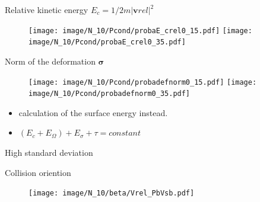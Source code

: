\documentclass[aspectratio=169]{beamer}
\begin{document}
\begin{frame}
  {Relative kinetic energy  $E_c = 1/2 m |\bm{v}{rel}|^2$}
  \begin{figure}
    \centering
    \texttt{[image: image/N\_10/Pcond/probaE\_crel0\_15.pdf]}
    \texttt{[image: image/N\_10/Pcond/probaE\_crel0\_35.pdf]}
  \end{figure}
\end{frame}

\begin{frame}
  {Norm of the deformation  $\bm{\sigma}$}
  \begin{figure}
    \centering
    \texttt{[image: image/N\_10/Pcond/probadefnorm0\_15.pdf]}
    \texttt{[image: image/N\_10/Pcond/probadefnorm0\_35.pdf]}
  \end{figure}
  \begin{itemize}
    \item calculation of the surface energy instead. 
    \item $(E_c + E_\Omega )+E_\sigma +\tau = constant$
  \end{itemize}
\end{frame}

\begin{frame}
   {High standard deviation}

\end{frame}

\begin{frame}
  {Collision oriention}
  \begin{figure}
    \texttt{[image: image/N\_10/beta/Vrel\_PbVsb.pdf]}
  \end{figure}
\end{frame}
\end{document}
